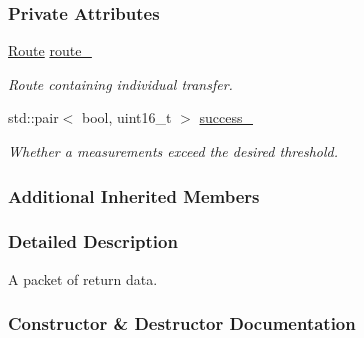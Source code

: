 \subsubsection*{Private Attributes}
\begin{DoxyCompactItemize}
\item 
\mbox{\label{classosse_1_1collaborate_1_1_packet_return_a57c61ee6e1ae3b9bf876b85f16918a92}} 
\hyperlink{classosse_1_1collaborate_1_1_packet_return_a1c00d25b9e8d526be915c28b8ee0ba3b}{Route} \hyperlink{classosse_1_1collaborate_1_1_packet_return_a57c61ee6e1ae3b9bf876b85f16918a92}{route\+\_\+}
\begin{DoxyCompactList}\small\item\em Route containing individual transfer. \end{DoxyCompactList}\item 
\mbox{\label{classosse_1_1collaborate_1_1_packet_return_aaa6dd0adedb9734bc5a17f06b0702d38}} 
std\+::pair$<$ bool, uint16\+\_\+t $>$ \hyperlink{classosse_1_1collaborate_1_1_packet_return_aaa6dd0adedb9734bc5a17f06b0702d38}{success\+\_\+}
\begin{DoxyCompactList}\small\item\em Whether a measurements exceed the desired threshold. \end{DoxyCompactList}\end{DoxyCompactItemize}
\subsubsection*{Additional Inherited Members}


\subsubsection{Detailed Description}
A packet of return data. 

\subsubsection{Constructor \& Destructor Documentation}
\mbox{\label{classosse_1_1collaborate_1_1_packet_return_a09a26d47a8b30c5f7002ca8e4b8bb89a}} 

